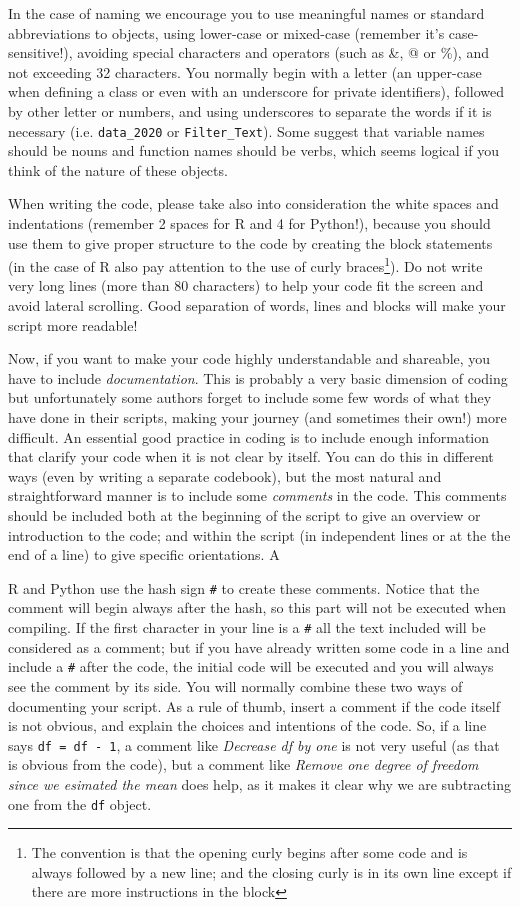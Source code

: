 In the case of naming we encourage you to use meaningful names or standard abbreviations to objects, using lower-case or mixed-case (remember it's case-sensitive!), avoiding special characters and operators (such as \&, @ or \%), and not exceeding 32 characters. You normally begin with a letter (an upper-case when defining a class or even with an underscore for private identifiers), followed by other letter or numbers, and using underscores to separate the words if it is necessary (i.e. \texttt{data\_2020} or \texttt{Filter\_Text}). Some suggest that variable names should be nouns and function names should be verbs, which seems logical if you think of the nature of these objects. 

When writing the code, please take also into consideration the white spaces and indentations (remember 2 spaces for R and 4 for Python!), because you should use them to give proper structure to the code by creating the block statements (in the case of R also pay attention to the use of curly braces\footnote{The convention is that the opening curly begins after some code and is always followed by a new line; and the closing curly is in its own line except if there are more instructions in the block}). Do not write very long lines (more than 80 characters) to help your code fit the screen and avoid lateral scrolling. Good separation of words, lines and blocks will make your script more readable!

Now, if you want to make your code highly understandable and shareable, you have to include \textit{documentation}.
This is probably a very basic dimension of coding but unfortunately some authors forget to include some few words of what they have done in their scripts, making your journey (and sometimes their own!) more difficult.
An essential good practice in coding is to include enough information that clarify your code when it is not clear by itself.
You can do this in different ways (even by writing a separate codebook), but the most natural and straightforward manner is to include some  \textit{comments} in the code.
This comments should be included both at the beginning of the script to give an overview or introduction to the code;
and within the script (in independent lines or at the the end of a line) to give specific orientations.
A

R and Python use the hash sign \texttt{\#} to create these comments. Notice that the comment will begin always after the hash, so this part will not be executed when compiling. If the first character in your line is  a \texttt{\#} all the text included will be considered as a comment; but if you have already written some code in a line and include a \texttt{\#} after the code, the initial code will be executed and you will always see the comment by its side. You will normally combine these two ways of documenting your script.
As a rule of thumb, insert a comment if the code itself is not obvious,
and explain the choices and intentions of the code.
So, if a line says \verb|df = df - 1|, a comment like \emph{Decrease df by one} is not very useful (as that is obvious from the code), but a comment like \emph{Remove one degree of freedom since we esimated the mean} does help, as it makes it clear why we are subtracting one from the \verb|df| object.

